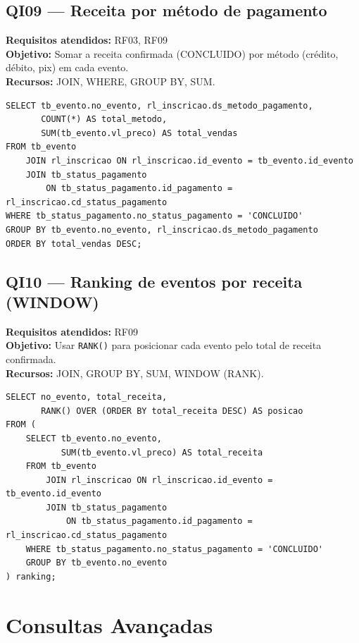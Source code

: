 \documentclass[12pt,a4paper]{article}
\begin{document}
\subsection{QI09 --- Receita por método de pagamento}
\textbf{Requisitos atendidos:} RF03, RF09 \\
\textbf{Objetivo:} Somar a receita confirmada (CONCLUIDO) por método (crédito, débito, pix) em cada evento.\\
\textbf{Recursos:} JOIN, WHERE, GROUP BY, SUM.
\begin{lstlisting}[caption={QI09 -- Receita por método de pagamento.}]
SELECT tb_evento.no_evento, rl_inscricao.ds_metodo_pagamento,
       COUNT(*) AS total_metodo,
       SUM(tb_evento.vl_preco) AS total_vendas
FROM tb_evento
    JOIN rl_inscricao ON rl_inscricao.id_evento = tb_evento.id_evento
    JOIN tb_status_pagamento
        ON tb_status_pagamento.id_pagamento = rl_inscricao.cd_status_pagamento
WHERE tb_status_pagamento.no_status_pagamento = 'CONCLUIDO'
GROUP BY tb_evento.no_evento, rl_inscricao.ds_metodo_pagamento
ORDER BY total_vendas DESC;
\end{lstlisting}

\subsection{QI10 --- Ranking de eventos por receita (WINDOW)}
\textbf{Requisitos atendidos:} RF09 \\
\textbf{Objetivo:} Usar \texttt{RANK()} para posicionar cada evento pelo total de receita confirmada.\\
\textbf{Recursos:} JOIN, GROUP BY, SUM, WINDOW (RANK).
\begin{lstlisting}[caption={QI10 -- Ranking de receita com RANK().}]
SELECT no_evento, total_receita,
       RANK() OVER (ORDER BY total_receita DESC) AS posicao
FROM (
    SELECT tb_evento.no_evento,
           SUM(tb_evento.vl_preco) AS total_receita
    FROM tb_evento
        JOIN rl_inscricao ON rl_inscricao.id_evento = tb_evento.id_evento
        JOIN tb_status_pagamento
            ON tb_status_pagamento.id_pagamento = rl_inscricao.cd_status_pagamento
    WHERE tb_status_pagamento.no_status_pagamento = 'CONCLUIDO'
    GROUP BY tb_evento.no_evento
) ranking;
\end{lstlisting}

\section{Consultas Avançadas}
\label{sec:consultas-adv}
\end{document}
